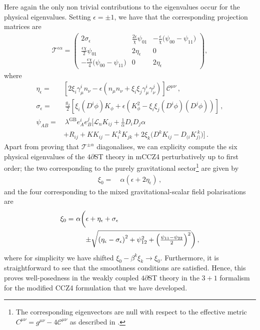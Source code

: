 \documentclass[reprint,aps,amsmath,amssymb,twoside,prd,showkeys,superscriptaddress,nofootinbib]{revtex4-2}
\begin{document}
Here again the only non trivial contributions to the eigenvalues occur for the physical eigenvalues. Setting $\epsilon=\pm1$, we have that the corresponding projection matrices are
\begin{eqnarray}
{\mathcal T}^{\epsilon\alpha}=\begin{pmatrix}2\sigma_{\epsilon}&\tfrac{2\epsilon}{\chi}\psi_{01}&-\tfrac{\epsilon}{\chi}\big(\psi_{00}-\psi_{11}\big)\\
\tfrac{\epsilon\chi}{2}\psi_{01}&2\eta_{\epsilon}&0\\
-\tfrac{\epsilon\chi}{4}\big(\psi_{00}-\psi_{11}\big)&0&2\eta_{\epsilon}\end{pmatrix},
\end{eqnarray}
where
\begin{align}
     \eta_{\epsilon}=&\textstyle\left[2\xi_i\gamma^i_{\mu}n_{\nu}-\epsilon\left(n_{\mu}n_{\nu} + \xi_i\xi_j\gamma^i_{\mu}\gamma^j_{\nu} \right)\right]{\mathcal C}^{\mu\nu}\,,\\
     \sigma_{\epsilon}=&~\frac{g_2}{2}\left[\xi_i(D^i\phi) K_{\phi}+\epsilon\left(K_{\phi}^2-\xi_i\xi_j(D^i\phi)(D^j\phi) \right) \right] \,,\\
     \psi_{AB}=&~\lambda^{\text{GB}}e_A^ie_B^j\Big[\textstyle{{\mathcal L}_nK_{ij}+\frac{1}{\alpha}D_iD_j\alpha} \\
     &\textstyle{+R_{ij}+KK_{ij}-K_i^{~k}K_{jk}
     +2\xi_k\big(D^kK_{ij}-D_{(i}K_{j)}^{~k} \big)}\Big]\nonumber\,.
\end{align} 
Apart from proving that ${\mathcal T}^{\pm\alpha}$ diagonalises, we can explicity compute the six physical eigenvalues of the $4\partial$ST theory in mCCZ4 perturbatively up to first order; the two corresponding to the purely gravitational sector\footnote{The corresponding eigenvectors are null with respect to the effective metric $C^{\mu\nu}=g^{\mu\nu}-4{\mathcal C}^{\mu\nu}$ as described in \cite{Reall:2021voz}.} are given by
 \begin{align}
 \label{eq:eigen_phys1}
 \xi_0=&~\alpha\left(\epsilon+2\eta_{\epsilon}\right)\,,
 \end{align} 
 and the four corresponding to the mixed gravitational-scalar field polarisations are 
 \begin{align}
 \label{eq:eigen_phys2}
 \xi_0=&~\alpha\bigg(\epsilon+\eta_{\epsilon}+\sigma_{\epsilon}\\
 &\hspace{0.6cm}\textstyle{\pm\sqrt{\left(\eta_{\epsilon}-\sigma_{\epsilon}\right)^2+\psi_{12}^2+\left(\frac{\psi_{11}-\psi_{22}}{2}\right)^2}\bigg)}\,,\nonumber
 \end{align}
where for simplicity we have shifted $\xi_0-\beta^k\xi_k\to \xi_0$. Furthermore, it is straightforward to see that the smoothness conditions are satisfied. Hence, this proves well-posedness in the weakly coupled $4\partial$ST theory in the $3+1$ formalism for the modified CCZ4 formulation that we have developed.
\end{document}
